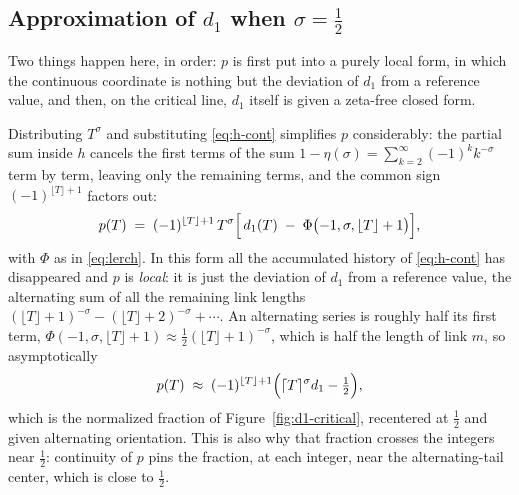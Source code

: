 \documentclass[11pt]{article}
\theoremstyle{definition}
\begin{document}
\subsection{Approximation of \texorpdfstring{$d_1$}{d1} when \texorpdfstring{$\sigma=\tfrac12$}{sigma=1/2}}\label{sec:d1-approx-critical}

Two things happen here, in order: $p$ is first put into a purely local form, in
which the continuous coordinate is nothing but the deviation of $d_1$ from a
reference value, and then, on the critical line, $d_1$ itself is given a
zeta-free closed form.

Distributing $T^{\sigma}$ and substituting \eqref{eq:h-cont} simplifies $p$
considerably: the partial sum inside $h$ cancels the first terms of the sum
$1-\eta(\sigma)=\sum_{k=2}^{\infty}(-1)^{k}k^{-\sigma}$ term by term, leaving
only the remaining terms, and the common sign $(-1)^{\lfloor T\rfloor+1}$ factors out:
\begin{equation}\label{eq:p-simplified}
p(T) \;=\; (-1)^{\lfloor T\rfloor+1}\, T^{\sigma}
\Bigl[\, d_1(T) \;-\; \Phi\bigl(-1,\sigma,\lfloor T\rfloor+1\bigr) \Bigr],
\end{equation}
with $\Phi$ as in \eqref{eq:lerch}.
In this form all the accumulated history
of \eqref{eq:h-cont} has disappeared and $p$ is \emph{local}: it is just the
deviation of $d_1$ from a reference value, the alternating sum of all the
remaining link lengths
$(\lfloor T\rfloor+1)^{-\sigma}-(\lfloor T\rfloor+2)^{-\sigma}+\cdots$.
An alternating series is roughly half its first term,
$\Phi(-1,\sigma,\lfloor T\rfloor+1)\approx\tfrac12(\lfloor T\rfloor+1)^{-\sigma}$,
which is half the length of link $m$, so asymptotically
\[
p(T) \;\approx\; (-1)^{\lfloor T\rfloor+1}
\Bigl( \lceil T\rceil^{\sigma} d_1 - \tfrac12 \Bigr),
\]
which is the normalized fraction of Figure~\ref{fig:d1-critical}, recentered
at $\tfrac12$ and given alternating orientation. This is also why that fraction
crosses the integers near $\tfrac12$: continuity of $p$ pins the fraction, at
each integer, near the alternating-tail center, which is close to $\tfrac12$.
\end{document}

